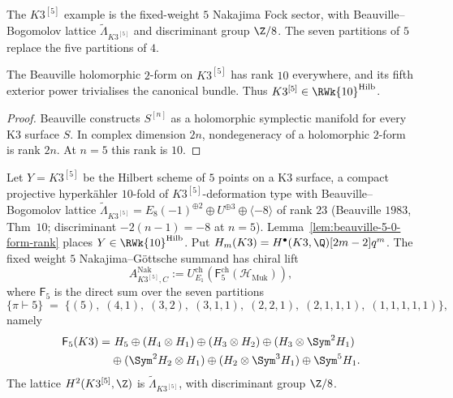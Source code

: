 The \(K3^{[5]}\) example is the fixed-weight \(5\) Nakajima Fock sector,
with Beauville--Bogomolov lattice \(\widetilde\Lambda_{K3^{[5]}}\) and
discriminant group \(\Z/8\). The seven partitions of \(5\) replace the five
partitions of \(4\).

\begin{lemma}
\label{lem:beauville-5-0-form-rank}
%
The Beauville holomorphic \(2\)-form on \(K3^{[5]}\) has rank \(10\)
everywhere, and its fifth exterior power trivialises the canonical bundle.
Thus \(K3^{[5]}\in\RWk{10}^{\mathrm{Hilb}}\).
\end{lemma}

\begin{proof}
Beauville constructs \(S^{[n]}\) as a holomorphic symplectic manifold for
every K3 surface \(S\). In complex dimension \(2n\), nondegeneracy of a
holomorphic \(2\)-form is rank \(2n\). At \(n=5\) this rank is \(10\).
\end{proof}

\begin{theorem}
\label{thm:phi-10-hilb5-k3}
%
%
Let $Y = K3^{[5]}$ be the Hilbert scheme of $5$ points on a K$3$
surface, a compact projective hyperk\"ahler $10$-fold of
$K3^{[5]}$-deformation type with Beauville--Bogomolov lattice
$\widetilde\Lambda_{K3^{[5]}} = E_8(-1)^{\oplus 2} \oplus U^{\oplus 3}
\oplus \langle -8\rangle$ of rank $23$ \textup{(}Beauville $1983$,
Thm~$10$; discriminant $-2(n-1) = -8$ at $n = 5$\textup{).}
Lemma~\ref{lem:beauville-5-0-form-rank} places
\(Y \in \RWk{10}^{\mathrm{Hilb}}\). Put
\(H_m(K3)=H^\bullet(K3,\Q)[2m-2]q^m\). The fixed weight \(5\)
Nakajima--G\"ottsche summand has chiral lift
\begin{equation}
\label{eq:phi-10-hilb5-k3-master}
 A^{\mathrm{Nak}}_{K3^{[5]},C}
 :=U^{\mathrm{ch}}_{E_1}\!\left(\mathsf F^{\mathrm{ch}}_5(\mathcal H_{\mathrm{Muk}})\right),
\end{equation}
where \(\mathsf F_5\) is the direct sum over the seven partitions
\[
 \{\pi \vdash 5\} \;=\; \bigl\{(5),\; (4,1),\; (3,2),\; (3,1,1),\;
 (2,2,1),\; (2,1,1,1),\; (1,1,1,1,1)\bigr\},
\]
namely
\[
\begin{aligned}
\mathsf F_5(K3)=&\ H_5\oplus(H_4\otimes H_1)\oplus(H_3\otimes H_2)
\oplus(H_3\otimes\Sym^2H_1)\\
&\oplus(\Sym^2H_2\otimes H_1)\oplus(H_2\otimes\Sym^3H_1)
\oplus\Sym^5H_1 .
\end{aligned}
\]
The lattice \(H^2(K3^{[5]},\Z)\) is
\(\widetilde\Lambda_{K3^{[5]}}\), with discriminant group \(\Z/8\).
\end{theorem}


